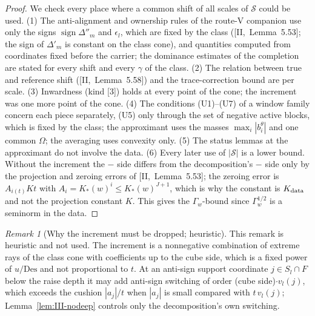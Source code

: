 \documentclass[10pt]{amsart}
\theoremstyle{definition}
\theoremstyle{remark}
\newtheorem{remark}[theorem]{Remark}
\newcommand{\sgn}{\operatorname{sign}}
\begin{document}
\begin{proof}
We check every place where a common shift of all scales of $\mathcal S$
could be used.  (1) The anti-alignment and ownership rules of the route-V
companion use only the signs $\sgn\Delta''_m$ and $\epsilon_l$, which are
fixed by the class ([II,~Lemma~5.53]; the sign of $\Delta'_m$ is constant on
the class cone), and quantities computed from coordinates fixed before the
carrier; the dominance estimates of the completion are stated for every
shift and every $\gamma$ of the class.  (2) The relation between true and
reference shift ([II,~Lemma~5.58]) and the trace-correction bound are per
scale.  (3) Inwardness (kind [3]) holds at every point of the cone; the
increment was one more point of the cone.  (4) The conditions (U1)--(U7) of a
window family concern each piece separately, (U5) only through the set of
negative active blocks, which is fixed by the class; the approximant uses the
masses $\max_i|b^\theta_i|$ and one common $\Omega$; the averaging uses
convexity only.  (5) The status lemmas at the approximant do not involve the
data.  (6) Every later use of $|\mathcal S|$ is a lower bound.  Without the
increment the $-$ side differs from the decomposition's $-$ side only by the
projection and zeroing errors of [II,~Lemma~5.53]; the zeroing error is
$A_{i(t)}Kt$ with $A_i=K_*(w)^i\le K_*(w)^{J+1}$, which is why the constant is
$K_{\rm data}$ and not the projection constant $K$.  This gives the
$\Gamma_w$-bound since $\Gamma_w^{1/2}$ is a seminorm in the data.
\end{proof}

\begin{remark}[Why the increment must be dropped; heuristic]\label{rem:III-cube}
This remark is heuristic and not used.  The increment is a nonnegative
combination of extreme rays of the class cone with coefficients up to the
cube side, which is a fixed power of $u/\mathrm{Des}$ and not proportional to
$t$.  At an anti-sign support coordinate $j\in S_l\cap F$ below the raise
depth it may add anti-sign switching of order (cube side)$\cdot v_l(j)$, which
exceeds the cushion $|a_j|/t$ when $|a_j|$ is small compared with
$t\,v_l(j)$; Lemma~\ref{lem:III-nodeep} controls only the decomposition's own
switching.
\end{remark}
\end{document}
